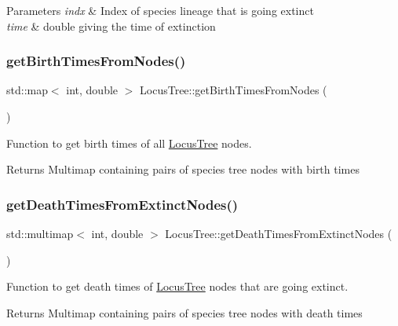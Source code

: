 \begin{DoxyParams}{Parameters}
{\em indx} & Index of species lineage that is going extinct \\
\hline
{\em time} & double giving the time of extinction \\
\hline
\end{DoxyParams}
\mbox{\label{class_locus_tree_a230fa4aeec913f6d567c0021efe83cce}} 
\subsubsection{\texorpdfstring{getBirthTimesFromNodes()}{getBirthTimesFromNodes()}}
{\footnotesize\ttfamily std\+::map$<$ int, double $>$ Locus\+Tree\+::get\+Birth\+Times\+From\+Nodes (\begin{DoxyParamCaption}{ }\end{DoxyParamCaption})}



Function to get birth times of all \mbox{\hyperlink{class_locus_tree}{Locus\+Tree}} nodes. 

\begin{DoxyReturn}{Returns}
Multimap containing pairs of species tree nodes with birth times 
\end{DoxyReturn}
\mbox{\label{class_locus_tree_abb55c1a342d51d1c9c14ded1ec956b7d}} 
\subsubsection{\texorpdfstring{getDeathTimesFromExtinctNodes()}{getDeathTimesFromExtinctNodes()}}
{\footnotesize\ttfamily std\+::multimap$<$ int, double $>$ Locus\+Tree\+::get\+Death\+Times\+From\+Extinct\+Nodes (\begin{DoxyParamCaption}{ }\end{DoxyParamCaption})}



Function to get death times of \mbox{\hyperlink{class_locus_tree}{Locus\+Tree}} nodes that are going extinct. 

\begin{DoxyReturn}{Returns}
Multimap containing pairs of species tree nodes with death times 
\end{DoxyReturn}
\mbox{\label{class_locus_tree_a5cb41c31ce0966a42a14bf533a59628b}} 

